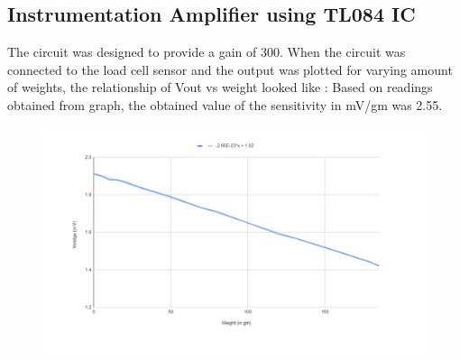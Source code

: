 \documentclass[12pt]{article}
\begin{document}
\subsection{Instrumentation Amplifier using TL084 IC}
The circuit was designed to provide a gain of 300. When the circuit was
connected to the load cell sensor and the output was plotted for varying
amount of weights, the relationship of Vout vs weight looked like : Based on
readings obtained from graph, the obtained value of the sensitivity in mV/gm
was 2.55.
\begin{figure}
\centering
\includegraphics[scale = 0.4]{graph1.png}
\end{figure}
\newpage
\end{document}
